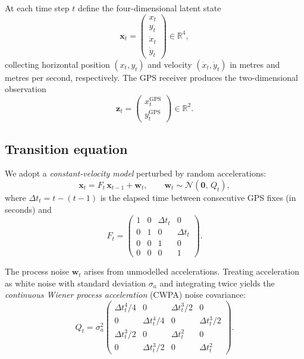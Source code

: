 \documentclass[11pt, a4paper]{article}
\newcommand{\x}{\bm{x}}
\newcommand{\z}{\bm{z}}
\newcommand{\w}{\bm{w}}
\newcommand{\N}{\mathcal{N}}
\newcommand{\R}{\mathbb{R}}
\theoremstyle{remark}
\begin{document}
At each time step $t$ define the four-dimensional latent state
\begin{equation}
  \x_t = \begin{pmatrix} x_t \\ y_t \\ \dot x_t \\ \dot y_t \end{pmatrix}
  \in \R^4,
\end{equation}
collecting horizontal position $(x_t, y_t)$ and velocity
$(\dot x_t, \dot y_t)$ in metres and metres per second, respectively.
The GPS receiver produces the two-dimensional observation
\begin{equation}
  \z_t = \begin{pmatrix} x_t^{\mathrm{GPS}} \\ y_t^{\mathrm{GPS}} \end{pmatrix}
  \in \R^2.
\end{equation}

\subsection{Transition equation}

We adopt a \emph{constant-velocity model} perturbed by random accelerations:
\begin{equation}
  \x_t = F_t\,\x_{t-1} + \w_t, \qquad \w_t \sim \N(\bm{0},\, Q_t),
  \label{eq:transition}
\end{equation}
where $\Delta t_t = t - (t-1)$ is the elapsed time between consecutive
GPS fixes (in seconds) and
\begin{equation}
  F_t = \begin{pmatrix}
    1 & 0 & \Delta t_t & 0 \\
    0 & 1 & 0 & \Delta t_t \\
    0 & 0 & 1 & 0 \\
    0 & 0 & 0 & 1
  \end{pmatrix}.
\end{equation}

The process noise $\w_t$ arises from unmodelled accelerations.
Treating acceleration as white noise with standard deviation
$\sigma_a$ and integrating twice yields the \emph{continuous Wiener
process acceleration} (CWPA) noise covariance:
\begin{equation}
  Q_t = \sigma_a^2
  \begin{pmatrix}
    \Delta t_t^4/4 & 0              & \Delta t_t^3/2 & 0 \\
    0              & \Delta t_t^4/4 & 0              & \Delta t_t^3/2 \\
    \Delta t_t^3/2 & 0              & \Delta t_t^2   & 0 \\
    0              & \Delta t_t^3/2 & 0              & \Delta t_t^2
  \end{pmatrix}.
  \label{eq:Q}
\end{equation}
\end{document}
